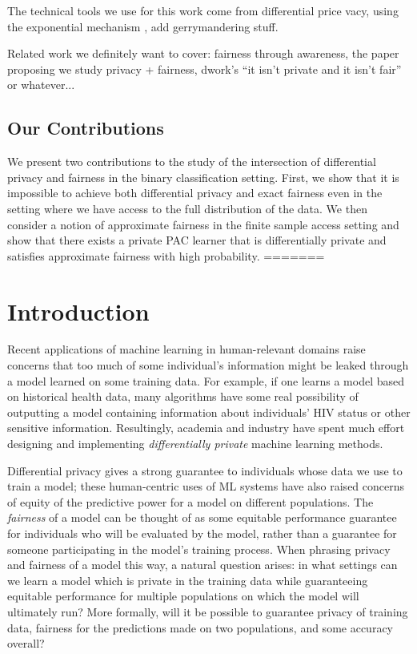 The technical tools we use for this work come from differential price
vacy, using the exponential mechanism \cite{2dplimits}, add gerrymandering stuff.



Related work we definitely want to cover: fairness through awareness,
the paper proposing we study privacy + fairness, dwork's ``it isn't
private and it isn't fair'' or whatever...

\subsection{Our Contributions}
We present two contributions to the study of the intersection of
differential privacy and fairness in the binary classification setting.
First, we show that it is impossible to achieve both differential
privacy and exact fairness even in the setting where we have access to
the full distribution of the data. We then consider a notion of
approximate fairness in the finite sample access setting and show that
there exists a private PAC learner that is differentially private and
satisfies approximate fairness with high probability. 
=======

\section{Introduction}
Recent applications of machine learning in human-relevant domains
raise concerns that too much of some individual's information might be
leaked through a model learned on some training data. For example, if
one learns a model based on historical health data, many algorithms
have some real possibility of outputting a model containing
information about individuals' HIV status or other sensitive
information.  Resultingly, academia and industry have spent much
effort designing and implementing \emph{differentially private}
machine learning methods.

Differential privacy gives a strong guarantee to individuals whose
data we use to train a model; these human-centric uses of ML systems
have also raised concerns of equity of the predictive power for a
model on different populations. The \emph{fairness} of a model can be
thought of as some equitable performance guarantee for individuals who
will be evaluated by the model, rather than a guarantee for someone
participating in the model's training process. When phrasing privacy
and fairness of a model this way, a natural question arises: in what
settings can we learn a model which is private in the training data
while guaranteeing equitable performance for multiple populations on
which the model will ultimately run? More formally, will it be
possible to guarantee privacy of training data, fairness for the
predictions made on two populations, and some accuracy overall?

